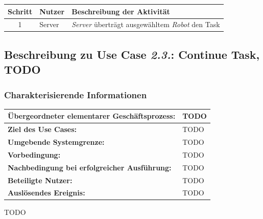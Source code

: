 				\begin{table}[H]
					\centering
					\begin{tabularx}{\textwidth}{|c|p{2cm}|X|}
						\hline
						Schritt & Nutzer & Beschreibung der Aktivität \\ \hline
						1 & Server & \emph{Server} überträgt ausgewähltem \emph{Robot} den Task \\
						\hline
					\end{tabularx}
				\end{table}
				
				
				\pagebreak
				
				
			\subsection*{Beschreibung zu Use Case \emph{2.3.}: Continue Task, TODO}
			
			\subsubsection*{Charakterisierende Informationen}
			
			\begin{table}[H]
				\centering
				\begin{tabularx}{\textwidth}{|p{5cm}|X|}
					\hline
					\textbf{Übergeordneter elementarer Geschäftsprozess:} & TODO  \\ \hline
					\textbf{Ziel des Use Cases:} & TODO \\ \hline
					\textbf{Umgebende Systemgrenze:} & TODO \\ \hline
					\textbf{Vorbedingung:} & TODO \\ \hline
					\textbf{Nachbedingung bei erfolgreicher Ausführung:} & TODO \\ \hline
					\textbf{Beteiligte Nutzer:} & TODO \\ \hline
					\textbf{Auslösendes Ereignis:} & TODO \\
					\hline
				\end{tabularx}
			\end{table}
			
			TODO
			
			
			\pagebreak

